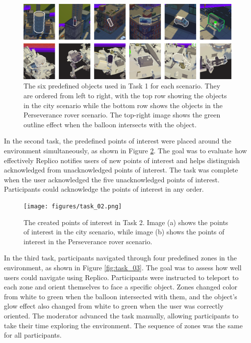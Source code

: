         \begin{figure}[h!]
            \centering
            \includegraphics[width=1\linewidth]{figures/task_01.png}
            \caption{The six predefined objects used in Task 1 for each scenario. They are ordered from left to right, with the top row showing the objects in the city scenario while the bottom row shows the objects in the Perseverance rover scenario. The top-right image shows the green outline effect when the balloon intersects with the object.}
            \label{fig:task_01}
        \end{figure}

        In the second task, the predefined points of interest were placed around the environment simultaneously, as shown in Figure \ref{fig:task_02}. The goal was to evaluate how effectively Replico notifies users of new points of interest and helps distinguish acknowledged from unacknowledged points of interest. The task was complete when the user acknowledged the five unacknowledged points of interest. Participants could acknowledge the points of interest in any order.

        \begin{figure}[h!]
            \centering
            \texttt{[image: figures/task\_02.png]}
            \caption{The created points of interest in Task 2. Image (a) shows the points of interest in the city scenario, while image (b) shows the points of interest in the Perseverance rover scenario.}
            \label{fig:task_02}
        \end{figure}

        In the third task, participants navigated through four predefined zones in the environment, as shown in Figure \ref{fig:task_03}. The goal was to assess how well users could navigate using Replico. Participants were instructed to teleport to each zone and orient themselves to face a specific object. Zones changed color from white to green when the balloon intersected with them, and the object's glow effect also changed from white to green when the user was correctly oriented. The moderator advanced the task manually, allowing participants to take their time exploring the environment. The sequence of zones was the same for all participants.

